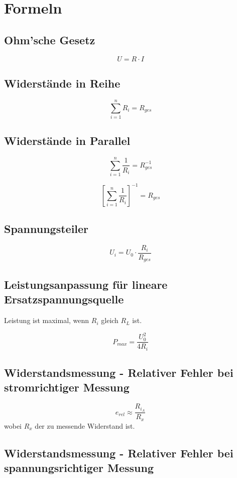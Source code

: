 \documentclass[a4paper, 11pt]{report}
\begin{document}
\section*{Formeln}

\subsection*{Ohm'sche Gesetz}

\[
U = R \cdot I
\]

\subsection*{Widerstände in Reihe}

\[
\sum_{i=1}^{n} R_i = R_{ges}
\]

\subsection*{Widerstände in Parallel}

\[
\sum_{i=1}^{n} \frac{1}{R_i} = R_{ges}^{-1}
\]

\[
\left[ \sum_{i=1}^{n} \frac{1}{R_i} \right]^{-1} = R_{ges}
\]

\subsection*{Spannungsteiler}

\[
U_i = U_0 \cdot \frac{R_i}{R_{ges}}
\]

\subsection*{Leistungsanpassung für lineare Ersatzspannungsquelle}
Leistung ist maximal, wenn \(R_i\) gleich \(R_L\) ist.

\[
P_{max} = \frac{U_0^{2}}{4R_i}
\]

\subsection*{Widerstandsmessung - Relativer Fehler bei stromrichtiger Messung}

\[
e_{rel} \approx \frac{R_{i_A}}{R_x}
\]
wobei \(R_x\) der zu messende Widerstand ist.

\subsection*{Widerstandsmessung - Relativer Fehler bei spannungsrichtiger Messung}
\end{document}
